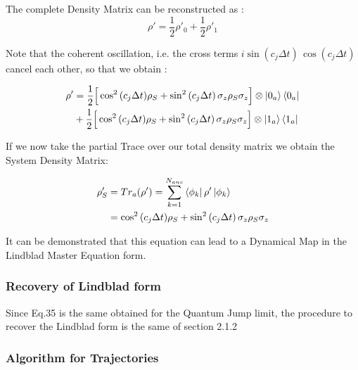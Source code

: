 \documentclass[a4paper,12pt]{article}
\begin{document}
	The complete Density Matrix can be reconstructed as : 
	\begin{equation}
		\rho' = \frac{1}{2} \rho'_{0} + \frac{1}{2} \rho'_{1} 
	\end{equation} 
	
	Note that the coherent oscillation, i.e. the cross terms $ i \sin{\left(c_{j} \Delta t\right)} \, \cos{\left(c_{j} \Delta t\right)} $ cancel each other, so that we obtain :
	
	\begin{align}
		\rho' &= \frac{1}{2} \Big[ \cos^{2}{\left(c_{j} \Delta t\right)} \rho_S + \sin^{2}{\left(c_{j} \Delta t\right)} \, \sigma_{z} \rho_S \sigma_{z} \Big] \otimes \ket{0_a}\bra{0_a} \notag \\
		& + \frac{1}{2} \Big[ \cos^{2}{\left(c_{j} \Delta t\right)} \rho_S + \sin^{2}{\left(c_{j} \Delta t\right)} \, \sigma_{z} \rho_S \sigma_{z} \Big] \otimes \ket{1_a}\bra{1_a}
	\end{align}
	
	\begin{flushleft}
		If we now take the partial Trace over our total density matrix we obtain the System Density Matrix:
	\end{flushleft}
	
	\begin{align}
		\rho'_S & = Tr_a(\rho') = \sum_{k=1}^{N_{anc}}{\bra{\phi_k}\rho'\ket{\phi_k}} \notag \\
		&= \cos^{2}{\left(c_{j} \Delta t\right)} \rho_S + \sin^{2}{\left(c_{j} \Delta t\right)} \, \sigma_{z} \rho_S \sigma_{z} 
	\end{align}	
	
	\begin{flushleft}
		It can be demonstrated that this equation can lead to a Dynamical Map in the Lindblad Master Equation form.  
	\end{flushleft}
	
	\subsubsection{Recovery of Lindblad form}
	
	Since Eq.35 is the same obtained for the Quantum Jump limit, the procedure to recover the Lindblad form is the same of section 2.1.2
	
	\subsubsection{Algorithm for Trajectories}
	
\end{document}
